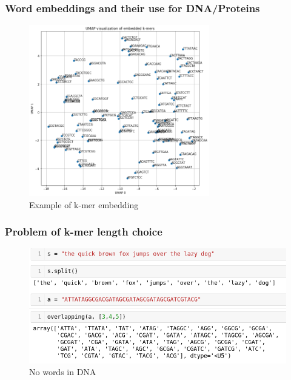 \documentclass[11pt,xcolor=x11names,compress]{beamer}
\renewcommand{\(}{\begin{columns}}
\renewcommand{\)}{\end{columns}}
\newcommand{\<}[1]{\begin{column}{#1}}
\renewcommand{\>}{\end{column}}
\begin{document}
\begin{frame}
	\frametitle{Word embeddings and their use for DNA/Proteins}
	\begin{figure}
		\includegraphics[width=0.7\textwidth]{embedding.png}
		\caption*{\tiny{Example of k-mer embedding}}
	\end{figure}
\end{frame}


\begin{frame}
	\frametitle{Problem of k-mer length choice}
	\begin{figure}
		\includegraphics[width=\textwidth]{kmers.png}
		\caption*{\tiny{No words in DNA}}
	\end{figure}
\end{frame}
\end{document}
